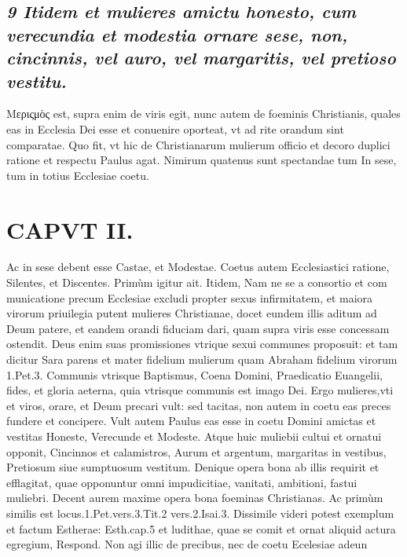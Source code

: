 \documentclass{article}
\begin{document}
\begin{pages}
\subsection*{\textit{9 Itidem et mulieres amictu honesto, cum verecundia et modestia ornare sese, non, cincinnis, vel auro, vel margaritis, vel pretioso vestitu. }}\pstart Μεριςμὸς est, supra enim de viris egit, nunc autem de foeminis Christianis, quales eas in Ecclesia Dei esse et conuenire oporteat, vt ad rite orandum sint comparatae. Quo fit, vt hic de Christianarum mulierum officio et decoro duplici ratione et respectu Paulus agat. Nimirum quatenus sunt spectandae tum In sese, tum in totius Ecclesiae coetu.  \pend
\section*{CAPVT II. }
\marginpar{[ p.77 ]}\pstart Ac in sese debent esse Castae, et Modestae. Coetus autem Ecclesiastici ratione, Silentes, et Discentes.  \pend\pstart Primùm igitur ait. Itidem, Nam ne se a consortio et com municatione precum Ecclesiae excludi propter sexus infirmitatem, et maiora virorum priuilegia putent mulieres Christianae, docet eundem illis aditum ad Deum patere, et eandem orandi fiduciam dari, quam supra viris esse concessam ostendit. Deus enim suas promissiones vtrique sexui communes proposuit: et tam dicitur Sara parens et mater fidelium mulierum quam Abraham fidelium virorum 1.Pet.3.  \pend\pstart Communis vtrisque Baptismus, Coena Domini, Praedicatio Euangelii, fides, et gloria aeterna, quia vtrisque communis est imago Dei. Ergo mulieres,vti et viros, orare, et Deum precari vult: sed tacitas, non autem in coetu eas preces fundere et concipere. Vult autem Paulus eas esse in coetu Domini amictas et vestitas Honeste, Verecunde et Modeste. Atque huic muliebii cultui et ornatui opponit, Cincinnos et calamistros, Aurum et argentum, margaritas in vestibus, Pretiosum siue sumptuosum vestitum. Denique opera bona ab illis requirit et efflagitat, quae opponuntur omni impudicitiae, vanitati, ambitioni, fastui muliebri. Decent aurem maxime opera bona foeminas Christianas.  \pend\pstart Ac primùm similis est locus.1.Pet.vers.3.Tit.2 vers.2.Isai.3.  \pend\pstart Dissimile videri potest exemplum et factum Estherae: Esth.cap.5 et ludithae, quae se comit et ornat aliquid actura egregium, Respond. Non agi illic de precibus, nec de coetu Ecelesiae adeun\pend

\end{pages}
\end{document}
